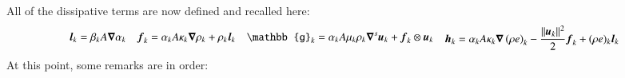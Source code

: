 All of the dissipative terms are now defined and recalled here:
%
\begin{subequations}\label{eq:visc-reg-7-equ-sect4}
\begin{align}
  \mbold l_k &= \beta_k A \grad \alpha_k 
\end{align}
\begin{align}
  \mbold f_k &= \alpha_k A \kappa_k \grad \rho_k + \rho_k  \mbold l_k 
\end{align}
\begin{align}
\mathbb{g}_k &= \alpha_k A \mu_k \rho_k \grad^s \mbold u_k + \mbold f_k \otimes \mbold u_k 
\end{align}
\begin{align}
  \mbold h_k &=  \alpha_k A \kappa_k \grad \left( \rho e \right)_k  - \frac{\| \mbold u_k \|^2}{2} \mbold f_k + (\rho e)_k \mbold l_k 
\end{align}
\end{subequations}
%
At this point, some remarks are in order:
